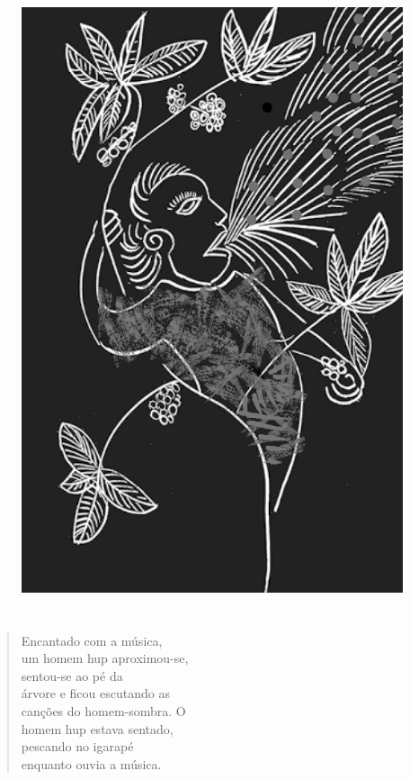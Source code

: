 \begin{figure}
\vspace*{-1.5cm}
\hspace*{-2.4cm}\includegraphics[width=142mm]{./imgs/img1.jpg}
\end{figure}

\chapter*{}

\mbox{}\vspace*{\fill}

\begin{verse}
Encantado com a música,\\
um homem hup aproximou-se,\\
sentou-se ao pé da\\
árvore e ficou escutando as\\
canções do homem-sombra. O\\
homem hup estava sentado,\\
pescando no igarapé\\
enquanto ouvia a música.
\end{verse}

